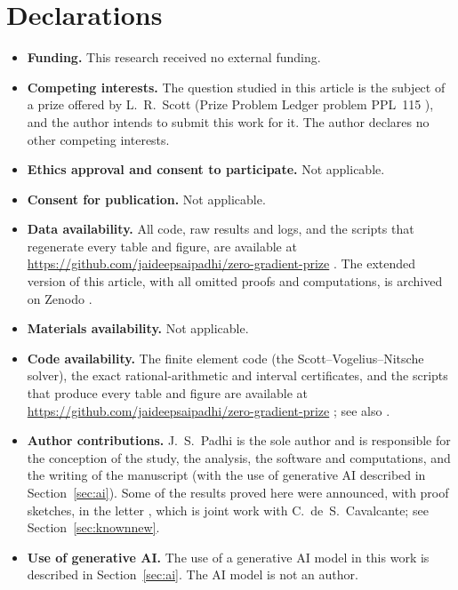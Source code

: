 \documentclass[pdflatex,sn-mathphys-num]{sn-jnl}
\theoremstyle{thmstyleone}
\theoremstyle{thmstylethree}
\begin{document}
\section*{Declarations}

\begin{itemize}
\item \textbf{Funding.} This research received no external funding.
\item \textbf{Competing interests.} The question studied in this article is the subject of a prize offered by L.~R.~Scott (Prize Problem Ledger problem PPL~115 \cite{ScottPrize}), and the author intends to submit this work for it. The author declares no other competing interests.
\item \textbf{Ethics approval and consent to participate.} Not applicable.
\item \textbf{Consent for publication.} Not applicable.
\item \textbf{Data availability.} All code, raw results and logs, and the scripts that regenerate every table and figure, are available at \url{https://github.com/jaideepsaipadhi/zero-gradient-prize} \cite{ZeroGradRepo}. The extended version of this article, with all omitted proofs and computations, is archived on Zenodo \cite{PadhiExt}.
\item \textbf{Materials availability.} Not applicable.
\item \textbf{Code availability.} The finite element code (the Scott--Vogelius--Nitsche solver), the exact rational-arithmetic and interval certificates, and the scripts that produce every table and figure are available at \url{https://github.com/jaideepsaipadhi/zero-gradient-prize} \cite{ZeroGradRepo}; see also \cite{PadhiExt}.
\item \textbf{Author contributions.} J.~S.~Padhi is the sole author and is responsible for the conception of the study, the analysis, the software and computations, and the writing of the manuscript (with the use of generative AI described in Section~\ref{sec:ai}). Some of the results proved here were announced, with proof sketches, in the letter \cite{CavalcantePadhiLetter}, which is joint work with C.~de~S.~Cavalcante; see Section~\ref{sec:knownnew}.
\item \textbf{Use of generative AI.} The use of a generative AI model in this work is described in Section~\ref{sec:ai}. The AI model is not an author.
\end{itemize}


\end{document}
